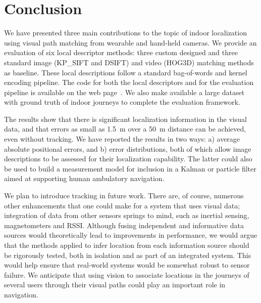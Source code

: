 \section{Conclusion}

We have presented three main contributions to the topic of indoor localization using visual path matching from wearable and hand-held cameras. We provide an evaluation of six local descriptor methods: three custom designed and three standard image (KP\_SIFT and DSIFT) and video (HOG3D) matching methods as baseline. These local descriptions follow a standard bag-of-words and kernel encoding pipeline. The code for both the local descriptors and for the evaluation pipeline is available on the web page~\cite{Rivera-Rubio2014}. We also make available a large dataset with ground truth of indoor journeys to complete the evaluation framework.

The results show that there is significant localization information in the visual data, and that errors as small as \SI{1.5}{m} over a \SI{50}{m} distance can be achieved, even without tracking. We have reported the results in two ways: a) average absolute positional errors, and b) error distributions, both of which allow image descriptions to be assessed for their localization capability.  The latter could also be used to build a measurement model for inclusion in a Kalman or particle filter  aimed at supporting human ambulatory navigation. 

We plan to introduce tracking in future work. There are, of course, numerous other enhancements that one could make for a system that uses visual data; integration of data from other sensors springs to mind, such as inertial sensing, magnetometers and RSSI.  Although fusing independent and informative data sources would theoretically lead to improvements in performance, we would argue that the methods applied to infer location from each information source should be rigorously tested, both in isolation and as part of an integrated system.  This would help ensure that real-world systems would be somewhat robust to sensor failure. We anticipate that using vision to associate locations in the journeys of several users through their visual paths could play an important role in navigation.

\label{sec:conclusion}


